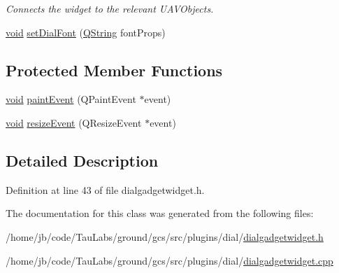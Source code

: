 \begin{DoxyCompactItemize}
\begin{DoxyCompactList}\small\item\em \-Connects the widget to the relevant \-U\-A\-V\-Objects. \end{DoxyCompactList}\item 
\hyperlink{group___u_a_v_objects_plugin_ga444cf2ff3f0ecbe028adce838d373f5c}{void} \hyperlink{group___dial_plugin_ga47e399b79845057cc9f7eab02fef380a}{set\-Dial\-Font} (\hyperlink{group___u_a_v_objects_plugin_gab9d252f49c333c94a72f97ce3105a32d}{\-Q\-String} font\-Props)
\end{DoxyCompactItemize}
\subsection*{\-Protected \-Member \-Functions}
\begin{DoxyCompactItemize}
\item 
\hyperlink{group___u_a_v_objects_plugin_ga444cf2ff3f0ecbe028adce838d373f5c}{void} \hyperlink{group___dial_plugin_ga35b76a1088cc50996f66ef23da926785}{paint\-Event} (\-Q\-Paint\-Event $\ast$event)
\item 
\hyperlink{group___u_a_v_objects_plugin_ga444cf2ff3f0ecbe028adce838d373f5c}{void} \hyperlink{group___dial_plugin_ga4ce19a0118b1518cf0469e2fc69dc86b}{resize\-Event} (\-Q\-Resize\-Event $\ast$event)
\end{DoxyCompactItemize}


\subsection{\-Detailed \-Description}


\-Definition at line 43 of file dialgadgetwidget.\-h.



\-The documentation for this class was generated from the following files\-:\begin{DoxyCompactItemize}
\item 
/home/jb/code/\-Tau\-Labs/ground/gcs/src/plugins/dial/\hyperlink{dialgadgetwidget_8h}{dialgadgetwidget.\-h}\item 
/home/jb/code/\-Tau\-Labs/ground/gcs/src/plugins/dial/\hyperlink{dialgadgetwidget_8cpp}{dialgadgetwidget.\-cpp}\end{DoxyCompactItemize}
